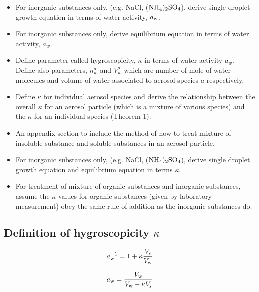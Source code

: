 \documentclass[12pt]{article}
\begin{document}
\begin{itemize}

\item For inorganic substances only, (e.g. NaCl, ($ \rm NH_{4})_{2} \rm SO_{4}$), derive single droplet growth equation in terms of water activity, $a_{\rm w}$.

\item For inorganic substances only, derive equilibrium equation in terms of water activity, $a_{w}$.

\item Define parameter called hygroscopicity, $\kappa$ in terms of water activity $a_{w}$. Define also parameters, $n_{w}^{a}$ and $V_{w}^{a}$ which are number of mole of water molecules and volume of water associated to aerosol species $a$ respectively. 

\item Define $\kappa$ for individual aerosol species and derive the relationship between the overall $\kappa$ for an aerosol particle (which is a mixture of various species) and the $\kappa$ for an individual species (Theorem 1). 

\item An appendix section to include the method of how to treat mixture of insoluble substance and soluble substances in an aerosol particle.

\item For inorganic substances only, (e.g. NaCl, ($ \rm NH_{4})_{2} \rm SO_{4}$), derive single droplet growth equation and equilibrium equation in terms $\kappa$.

\item For treatment of mixture of organic substances and inorganic substances, assume the $\kappa$ values for organic substances (given by laboratory measurement) obey the same rule of addition as the inorganic substances do.

\end{itemize}

\subsection{Definition of hygroscopicity $\kappa$}

\begin{equation}\label{eqn:10}
a_{\rm w}^{-1}=1+\kappa \frac{V_{\rm s}}{V_{\rm w}}
\end{equation}

\begin{equation}\label{eqn:11}
a_{\rm w}=\frac{V_{\rm w}}{V_{\rm w} + \kappa V_{\rm s}}
\end{equation}
\end{document}
